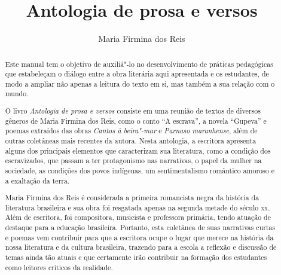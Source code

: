 \documentclass[12pt]{extarticle}
\begin{document}
\newcommand{\AutorLivro}{Maria Firmina dos Reis}
\newcommand{\TituloLivro}{Antologia de prosa e versos}
\newcommand{\Tema}{Ficção, mistério e fantasia}
\newcommand{\Genero}{Conto; crônica, novela e poema}
\newcommand{\imagemCapa}{./images/PNLD0014-01.png}
\newcommand{\issnppub}{978-65-994412-0-2}
\newcommand{\issnepub}{978-65-994412-3-3}
\newcommand{\colaborador}{{Rodrigo Jorge Ribeiro Neves}}


\title{\TituloLivro}
\author{\AutorLivro}
\def\authornotes{\colaborador}

\date{}
\maketitle


\begin{abstract}

Este manual tem o objetivo de auxiliá"-lo no desenvolvimento de práticas
pedagógicas que estabeleçam o diálogo entre a obra literária aqui
apresentada e os estudantes, de modo a ampliar não apenas a leitura do
texto em si, mas também a sua relação com o mundo.

O livro \emph{Antologia de prosa e versos} consiste em uma reunião de
textos de diversos gêneros de Maria Firmina dos Reis, como o conto ``A
escrava'', a novela ``Gupeva'' e poemas extraídos das obras \emph{Cantos
à beira"-mar} e \emph{Parnaso maranhense}, além de outras coletâneas mais
recentes da autora. Nesta antologia, a escritora apresenta alguns dos
principais elementos que caracterizam sua literatura, como a condição
dos escravizados, que passam a ter protagonismo nas narrativas, o papel
da mulher na sociedade, as condições dos povos indígenas, um
sentimentalismo romântico amoroso e a exaltação da terra.

Maria Firmina dos Reis é considerada a primeira romancista negra da
história da literatura brasileira e sua obra foi resgatada apenas na
segunda metade do século \textsc{xx}. Além de escritora, foi compositora,
musicista e professora primária, tendo atuação de destaque para a
educação brasileira. Portanto, esta coletânea de suas narrativas curtas
e poemas vem contribuir para que a escritora ocupe o lugar que merece na
história da nossa literatura e da cultura brasileira, trazendo para a
escola a reflexão e discussão de temas ainda tão atuais e que certamente
irão contribuir na formação dos estudantes como leitores críticos da
realidade.


\end{abstract}
\end{document}
